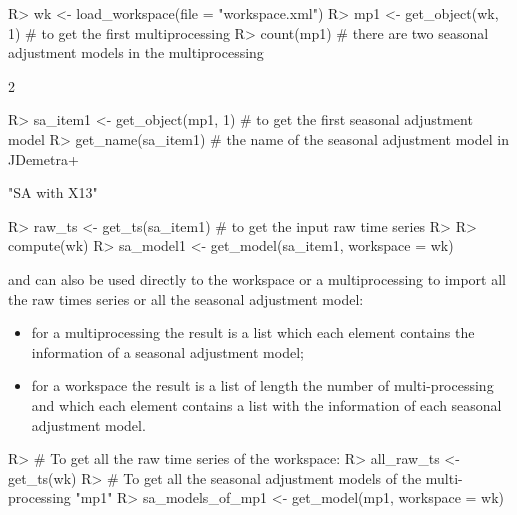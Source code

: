 \documentclass[article]{jss}
\providecommand{\tightlist}{%
  \setlength{\itemsep}{0pt}\setlength{\parskip}{0pt}}
\begin{document}
\begin{CodeChunk}

\begin{CodeInput}
R> wk <- load_workspace(file =  "workspace.xml")
R> mp1 <- get_object(wk, 1) # to get the first multiprocessing
R> count(mp1) # there are two seasonal adjustment models in the multiprocessing
\end{CodeInput}

\begin{CodeOutput}
[1] 2
\end{CodeOutput}

\begin{CodeInput}
R> sa_item1 <- get_object(mp1, 1) # to get the first seasonal adjustment model
R> get_name(sa_item1) # the name of the seasonal adjustment model in JDemetra+
\end{CodeInput}

\begin{CodeOutput}
[1] "SA with X13"
\end{CodeOutput}

\begin{CodeInput}
R> raw_ts <- get_ts(sa_item1) # to get the input raw time series
R> 
R> compute(wk)
R> sa_model1 <- get_model(sa_item1, workspace = wk)
\end{CodeInput}
\end{CodeChunk}

 and  can also be used directly to the
workspace or a multiprocessing to import all the raw times series or all
the seasonal adjustment model:

\begin{itemize}
\tightlist
\item
  for a multiprocessing the result is a list which each element contains
  the information of a seasonal adjustment model;\\
\item
  for a workspace the result is a list of length the number of
  multi-processing and which each element contains a list with the
  information of each seasonal adjustment model.
\end{itemize}

\begin{CodeChunk}

\begin{CodeInput}
R> # To get all the raw time series of the workspace:
R> all_raw_ts <- get_ts(wk)
R> # To get all the seasonal adjustment models of the multi-processing "mp1"
R> sa_models_of_mp1 <- get_model(mp1, workspace = wk)
\end{CodeInput}
\end{CodeChunk}
\end{document}
